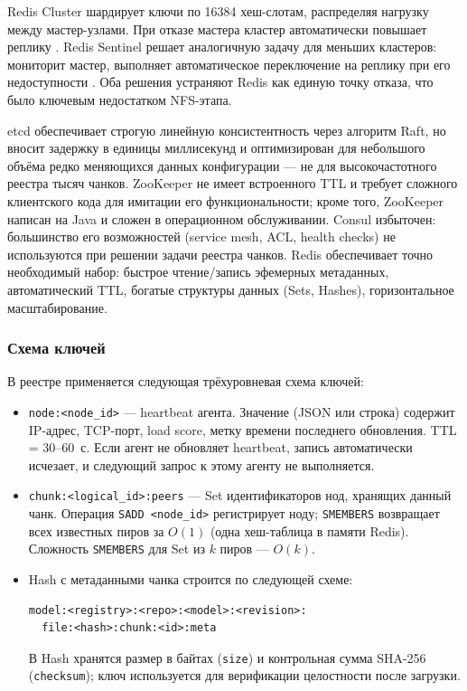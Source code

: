  Redis Cluster шардирует ключи по 16384 хеш-слотам, распределяя нагрузку между мастер-узлами. При отказе мастера кластер автоматически повышает реплику \cite{redis_cluster_docs}. Redis Sentinel решает аналогичную задачу для меньших кластеров: мониторит мастер, выполняет автоматическое переключение на реплику при его недоступности \cite{redis_sentinel_docs}. Оба решения устраняют Redis как единую точку отказа, что было ключевым недостатком NFS-этапа.

 etcd обеспечивает строгую линейную консистентность через алгоритм Raft, но вносит задержку в единицы миллисекунд и оптимизирован для небольшого объёма редко меняющихся данных конфигурации --- не для высокочастотного реестра тысяч чанков. ZooKeeper не имеет встроенного TTL и требует сложного клиентского кода для имитации его функциональности; кроме того, ZooKeeper написан на Java и сложен в операционном обслуживании. Consul избыточен: большинство его возможностей (service mesh, ACL, health checks) не используются при решении задачи реестра чанков. Redis обеспечивает точно необходимый набор: быстрое чтение/запись эфемерных метаданных, автоматический TTL, богатые структуры данных (Sets, Hashes), горизонтальное масштабирование.

\subsubsection{Схема ключей}

В реестре применяется следующая трёхуровневая схема ключей:

\begin{itemize}[leftmargin=*]
  \item \texttt{node:<node\_id>} --- heartbeat агента. Значение (JSON или строка) содержит IP-адрес, TCP-порт, load score, метку времени последнего обновления. TTL = 30--60~с. Если агент не обновляет heartbeat, запись автоматически исчезает, и следующий запрос к этому агенту не выполняется.
  \item \texttt{chunk:<logical\_id>:peers} --- Set идентификаторов нод, хранящих данный чанк. Операция \texttt{SADD <node\_id>} регистрирует ноду; \texttt{SMEMBERS} возвращает всех известных пиров за $O(1)$ (одна хеш-таблица в памяти Redis). Сложность \texttt{SMEMBERS} для Set из $k$ пиров --- $O(k)$.
  \item Hash с метаданными чанка строится по следующей схеме:
\begin{lstlisting}[numbers=none,frame=none,basicstyle=\footnotesize\ttfamily]
model:<registry>:<repo>:<model>:<revision>:
  file:<hash>:chunk:<id>:meta
\end{lstlisting}
  В Hash хранятся размер в байтах (\texttt{size}) и контрольная сумма SHA-256 (\texttt{checksum}); ключ используется для верификации целостности после загрузки.
\end{itemize}

